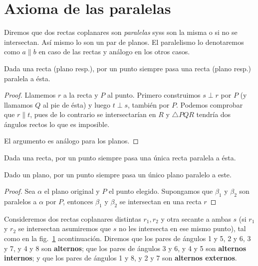 \documentclass[11pt,a4paper]{book}
\begin{document}
\section{Axioma de las paralelas}
\begin{mydef}[Paralelismo]
Diremos que dos rectas coplanares son \textit{paralelas} syss son la misma o si no se intersectan. Así mismo lo son un par de planos. El paralelismo lo denotaremos como $a\parallel b$ en caso de las rectas y análogo en los otros casos.
\end{mydef}
\begin{prop}
Dada una recta (plano resp.), por un punto siempre pasa una recta (plano resp.) paralela a ésta.
\end{prop}
\begin{proof}
Llamemos $r$ a la recta y $P$ al punto. Primero construimos $s\perp r$ por $P$ (y llamamos $Q$ al pie de ésta) y luego $t\perp s$, también por $P$. Podemos comprobar que $r\parallel t$, pues de lo contrario se intersectarían en $R$ y $\triangle PQR$ tendría dos ángulos rectos lo que es imposible.

El argumento es análogo para los planos.
\end{proof}
\begin{axiom}
Dada una recta, por un punto siempre pasa una única recta paralela a ésta.
\end{axiom}
\begin{cor}
Dado un plano, por un punto siempre pasa un único plano paralelo a este.
\end{cor}
\begin{proof}
Sea $\alpha$ el plano original y $P$ el punto elegido. Supongamos que $\beta_1$ y $\beta_2$ son paralelos a $\alpha$ por $P$, entonces $\beta_1$ y $\beta_2$ se intersectan en una recta $r$
\end{proof}
Consideremos dos rectas coplanares distintas $r_1,r_2$ y otra secante a ambas $s$ (si $r_1$ y $r_2$ se intersectan asumiremos que $s$ no les intersecta en ese mismo punto), tal como en la fig.~\ref{fig:alternated-angles} acontinuación. Diremos que los pares de ángulos 1 y 5, 2 y 6, 3 y 7, y 4 y 8 son \textbf{alternos}; que los pares de ángulos 3 y 6, y 4 y 5 son \textbf{alternos internos}; y que los pares de ángulos 1 y 8, y 2 y 7 son \textbf{alternos externos}.
\begin{figure}
\centering
{}
\caption{}\label{fig:alternated-angles}
\end{figure}
\end{document}
